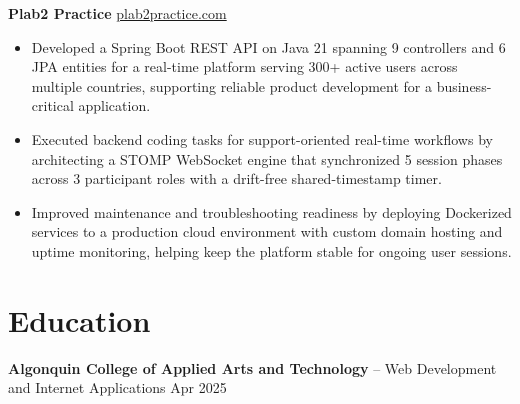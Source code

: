 \documentclass[11pt]{article}       %
\begin{document}
\textbf{Plab2 Practice} \hfill \href{https://plab2practice.com}{plab2practice.com} \\
\vspace{-9pt}
\begin{itemize}
  \item Developed a Spring Boot REST API on Java 21 spanning 9 controllers and 6 JPA entities for a real-time platform serving 300+ active users across multiple countries, supporting reliable product development for a business-critical application.
  \item Executed backend coding tasks for support-oriented real-time workflows by architecting a STOMP WebSocket engine that synchronized 5 session phases across 3 participant roles with a drift-free shared-timestamp timer.
  \item Improved maintenance and troubleshooting readiness by deploying Dockerized services to a production cloud environment with custom domain hosting and uptime monitoring, helping keep the platform stable for ongoing user sessions.
\end{itemize}





\section*{Education}
\textbf{Algonquin College of Applied Arts and Technology} -- Web Development and Internet Applications
\hfill Apr 2025 \\
\end{document}
